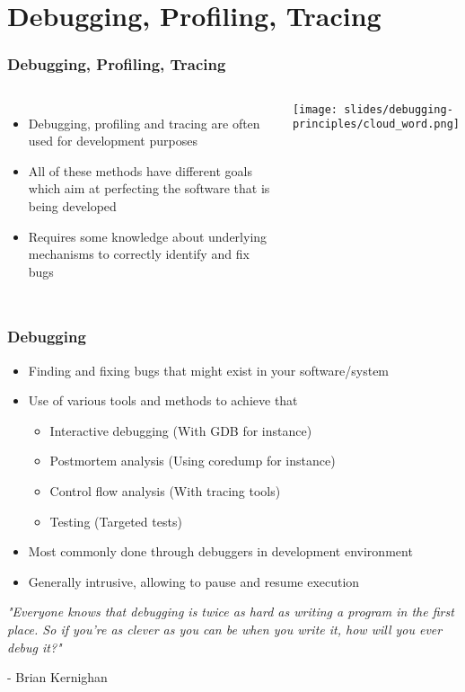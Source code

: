 \section{Debugging, Profiling, Tracing}

\begin{frame}
\frametitle{Debugging, Profiling, Tracing}
  \begin{columns}
    \begin{itemize}
      \item Debugging, profiling and tracing are often used for development purposes
      \item All of these methods have different goals which aim at perfecting the
            software that is being developed
      \item Requires some knowledge about underlying mechanisms to correctly identify
            and fix bugs
    \end{itemize}
    \vspace{0.5cm}
    \texttt{[image: slides/debugging-principles/cloud\_word.png]}
  \end{columns}
\end{frame}

\begin{frame}
  \frametitle{Debugging}
  \begin{itemize}
    \item Finding and fixing bugs that might exist in your software/system
    \item Use of various tools and methods to achieve that
    \begin{itemize}
      \item Interactive debugging (With GDB for instance)
      \item Postmortem analysis (Using coredump for instance)
      \item Control flow analysis (With tracing tools)
      \item Testing (Targeted tests)
    \end{itemize}
    \item Most commonly done through debuggers in development environment
    \item Generally intrusive, allowing to pause and resume execution
  \end{itemize}
  \vspace{0.5cm}

  {\small \em "Everyone knows that debugging is twice as hard as writing a program in the first place. So if you're as
    clever as you can be when you write it, how will you ever debug it?" 

  - Brian Kernighan }

\end{frame}

